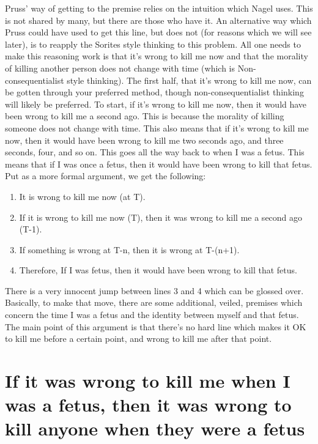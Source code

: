 Pruss' way of getting to the premise relies on the intuition which Nagel uses. This is not shared by many, but there are those who have it. An alternative way which Pruss could have used to get this line, but does not (for reasons which we will see later), is to reapply the Sorites style thinking to this problem. All one needs to make this reasoning work is that it's wrong to kill me now and that the morality of killing another person does not change with time (which is Non-consequentialist style thinking).  The first half, that it's wrong to kill me now, can be gotten through your preferred method, though non-consequentialist thinking will likely be preferred. To start, if it's wrong to kill me now, then it would have been wrong to kill me a second ago. This is because the morality of killing someone does not change with time. This also means that if it's wrong to kill me now, then it would have been wrong to kill me two seconds ago, and three seconds, four, and so on. This goes all the way back to when I was a fetus. This means that if I was once a fetus, then it would have been wrong to kill that fetus. Put as a more formal argument, we get the following:
\begin{enumerate}
    \item It is wrong to kill me now (at T).
    \item If it is wrong to kill me now (T), then it was wrong to kill me a second ago (T-1).
    \item If something is wrong at T-n, then it is wrong at T-(n+1).
    \item Therefore, If I was fetus, then it would have been wrong to kill that fetus.
\end{enumerate}
There is a very innocent jump between lines 3 and 4 which can be glossed over. Basically, to make that move, there are some additional, veiled, premises which concern the time I was a fetus and the identity between myself and that fetus. The main point of this argument is that there's no hard line which makes it OK to kill me before a certain point, and wrong to kill me after that point. 

\section{If it was wrong to kill me when I was a fetus, then it was wrong to kill anyone when they were a fetus}

